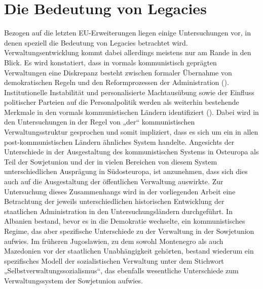 \section{Die Bedeutung von Legacies}
Bezogen auf die letzten EU-Erweiterungen liegen einige Untersuchungen vor, in denen speziell die Bedeutung von Legacies betrachtet wird. Verwaltungsentwicklung kommt dabei allerdings meistens nur am Rande in den Blick. Es wird konstatiert, dass in vormals kommunistisch geprägten Verwaltungen eine Diskrepanz besteht zwischen formaler Übernahme von demokratischen Regeln und den Reformprozessen der Administration (\cite{dimgoe, meyersah06}). Institutionelle Instabilität und personalisierte Machtausübung sowie der Einfluss politischer Parteien auf die Personalpolitik werden als weiterhin bestehende Merkmale in den vormals kommunistischen Ländern identifiziert (\cite{goewoll,meyersah08a}). Dabei wird in den Untersuchungen in der Regel von „der“ kommunistischen Verwaltungsstruktur gesprochen und somit impliziert, dass es sich um ein in allen post-kommunistischen Ländern ähnliches System handelte. Angesichts der Unterschiede in der Ausgestaltung des kommunistischen Systems in Osteuropa als Teil der Sowjetunion und der in vielen Bereichen von diesem System unterschiedlichen Ausprägung in Südosteuropa, ist anzunehmen, dass sich dies auch auf die Ausgestaltung der öffentlichen Verwaltung auswirkte. Zur Untersuchung dieses Zusammenhangs wird in der vorliegenden Arbeit eine Betrachtung der jeweils unterschiedlichen historischen Entwicklung der staatlichen Administration in den Untersuchungsländern durchgeführt. In Albanien bestand, bevor es in die Demokratie wechselte, ein kommunistisches Regime, das aber spezifische Unterschiede zu der Verwaltung in der Sowjetunion aufwies. Im früheren Jugoslawien, zu dem sowohl Montenegro als auch Mazedonien vor der staatlichen Unabhängigkeit gehörten, bestand wiederum ein spezifisches Modell der sozialistischen Verwaltung unter dem Stichwort „Selbstverwaltungssozialismus“, das ebenfalls wesentliche Unterschiede zum Verwaltungssystem der Sowjetunion aufwies.\par

